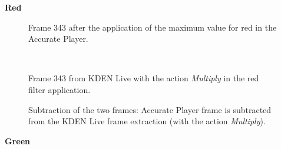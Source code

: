 \documentclass[../MasterThesis.tex]{subfiles}
\begin{document}
\vspace*{-1em}

\textbf{Red}

\vspace*{-1em}


\begin{minipage}{0.48\textwidth}
	\begin{figure}[H]
		\begin{center}
			\caption[Frame 343 after the application of the red filter in the Accurate Player.]{Frame 343 after the application of the maximum value for red in the Accurate Player.}
		\end{center}
	\end{figure}
\end{minipage}\begin{minipage}{0.04\textwidth}
	\ 
\end{minipage}\begin{minipage}{0.48\textwidth}
	\begin{figure}[H]
		\begin{center}
			\caption[Frame 343 from KDEN Live with the action \textit{Multiply}.]{Frame 343 from KDEN Live with the action \textit{Multiply} in the red filter application.}
		\end{center}
	\end{figure}
\end{minipage}

\vspace*{-1em}

\begin{figure}[H]
	\begin{center}
		\caption[Subtraction of KDEN Live (\textit{Multiply} and Accurate Player).]{Subtraction of the two frames: Accurate Player frame is subtracted from the KDEN Live frame extraction (with the action \textit{Multiply}).}
	\end{center}
\end{figure}




\vspace*{-1em}
\textbf{Green}

\vspace*{-1em}
\end{document}
